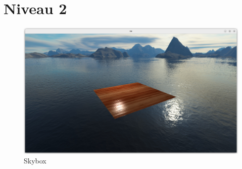 \documentclass{article}
\begin{document}
\section{Niveau 2}

\begin{figure}[h]
    \centering
    \includegraphics[width=0.5\linewidth]{images/skybox.png}
    \caption{Skybox}
    \label{fig:skybox}
\end{figure}
\end{document}
